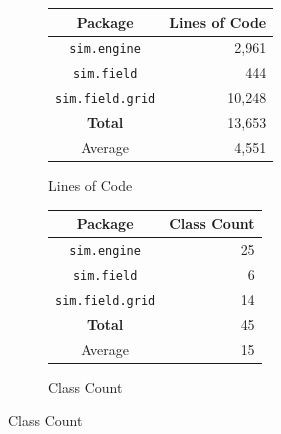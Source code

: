 \documentclass[11pt]{article}
\begin{document}
\begin{figure}[htp]
\begin{subfigure}[b]{0.5\textwidth}
\begin{center}
\begin{tabular}{|c|r|}
	\hline
	\textbf{Package} & \textbf{Lines of Code} \\
	\hline
	\texttt{sim.engine} & 2,961 \\
	\texttt{sim.field} & 444 \\
	\texttt{sim.field.grid} & 10,248 \\
	\hline
	\textbf{Total} & 13,653 \\
	\hline
	Average & 4,551 \\
	\hline
\end{tabular}
\end{center}
\caption{Lines of Code}
\label{table:loc}
\end{subfigure}
\begin{subfigure}[b]{0.5\textwidth}
\begin{center}
\begin{tabular}{|c|r|}
	\hline
	\textbf{Package} & \textbf{Class Count} \\
	\hline
	\texttt{sim.engine} & 25 \\
	\texttt{sim.field} & 6 \\
	\texttt{sim.field.grid} & 14 \\
	\hline
	\textbf{Total} & 45 \\
	\hline
	Average & 15 \\
	\hline
\end{tabular}
\end{center}
\caption{Class Count}
\label{table:class_count}
\end{subfigure}

\par\bigskip


\end{figure}
\end{document}
